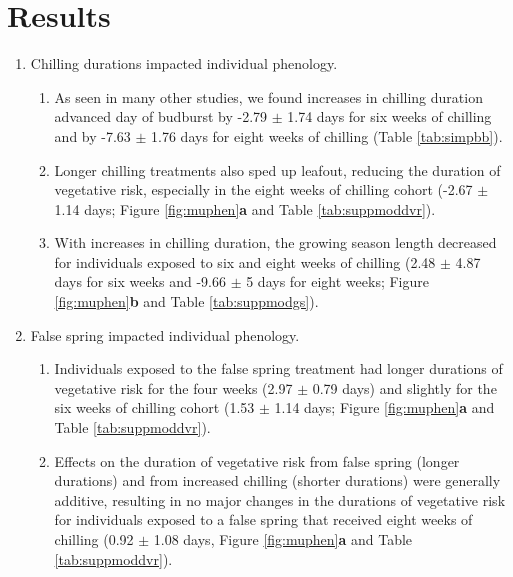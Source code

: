 \documentclass{article}\usepackage[]{graphicx}\usepackage[]{color}
\begin{document}
\section*{Results}
\begin{enumerate}
\item Chilling durations impacted individual phenology. %
  \begin{enumerate}
  \item As seen in many other studies, we found increases in chilling duration advanced day of budburst by -2.79 $\pm$ 1.74 days for six weeks of chilling and by -7.63 $\pm$ 1.76 days for eight weeks of chilling (Table \ref{tab:simpbb}).
  \item Longer chilling treatments also sped up leafout, reducing the duration of vegetative risk, especially in the eight weeks of chilling cohort (-2.67 $\pm$ 1.14 days; Figure \ref{fig:muphen}\textbf{a} and Table \ref{tab:suppmoddvr}).
  \item With increases in chilling duration, the growing season length decreased for individuals exposed to six and eight weeks of chilling (2.48 $\pm$ 4.87 days for six weeks and -9.66 $\pm$ 5 days for eight weeks; Figure \ref{fig:muphen}\textbf{b} and Table \ref{tab:suppmodgs}).
  \end{enumerate}
 
\item False spring impacted individual phenology. 
  \begin{enumerate}
  \item Individuals exposed to the false spring treatment had longer durations of vegetative risk for the four weeks (2.97 $\pm$ 0.79 days) and slightly for the six weeks of chilling cohort (1.53 $\pm$ 1.14 days; Figure \ref{fig:muphen}\textbf{a} and Table \ref{tab:suppmoddvr}). 
  \item Effects on the duration of vegetative risk from false spring (longer durations) and from increased chilling (shorter durations) were generally additive, resulting in no major changes in the durations of vegetative risk for individuals exposed to a false spring that received eight weeks of chilling (0.92 $\pm$ 1.08 days, Figure \ref{fig:muphen}\textbf{a} and Table \ref{tab:suppmoddvr}). 
  \end{enumerate}
  

\end{enumerate}
\end{document}
